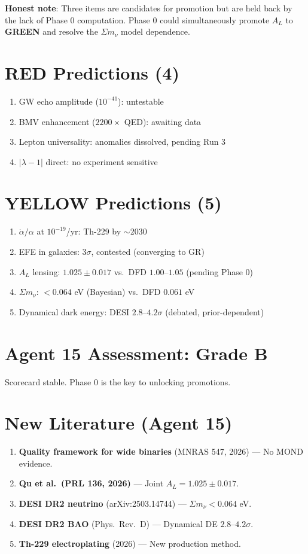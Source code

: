\documentclass[11pt,a4paper]{article}
\newcommand{\GREEN}{\textcolor{dfdgreen}{\textbf{GREEN}}}
\begin{document}
\textbf{Honest note}: Three items are candidates for promotion but are held back by the lack of Phase 0 computation. Phase 0 could simultaneously promote $A_L$ to \GREEN{} and resolve the $\Sigma m_\nu$ model dependence.

\section{RED Predictions (4)}

\begin{enumerate}
\item GW echo amplitude ($10^{-41}$): untestable
\item BMV enhancement ($2200\times$ QED): awaiting data
\item Lepton universality: anomalies dissolved, pending Run 3
\item $|\lambda-1|$ direct: no experiment sensitive
\end{enumerate}

\section{YELLOW Predictions (5)}

\begin{enumerate}
\item $\dot{\alpha}/\alpha$ at $10^{-19}$/yr: Th-229 by $\sim$2030
\item EFE in galaxies: $3\sigma$, contested (converging to GR)
\item $A_L$ lensing: $1.025 \pm 0.017$ vs.\ DFD $1.00$--$1.05$ (pending Phase 0)
\item $\Sigma m_\nu$: $< 0.064$ eV (Bayesian) vs.\ DFD $0.061$ eV
\item Dynamical dark energy: DESI $2.8$--$4.2\sigma$ (debated, prior-dependent)
\end{enumerate}

\section{Agent 15 Assessment: Grade B}

Scorecard stable. Phase 0 is the key to unlocking promotions.

\section{New Literature (Agent 15)}

\begin{enumerate}
\item \textbf{Quality framework for wide binaries} (MNRAS 547, 2026) --- No MOND evidence.
\item \textbf{Qu et al.\ (PRL 136, 2026)} --- Joint $A_L = 1.025 \pm 0.017$.
\item \textbf{DESI DR2 neutrino} (arXiv:2503.14744) --- $\Sigma m_\nu < 0.064$ eV.
\item \textbf{DESI DR2 BAO} (Phys.\ Rev.\ D) --- Dynamical DE $2.8$--$4.2\sigma$.
\item \textbf{Th-229 electroplating} (2026) --- New production method.
\end{enumerate}
\end{document}

